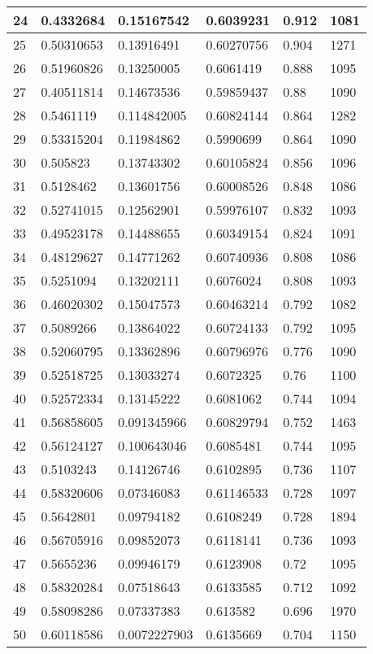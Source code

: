 \begin{longtable}{|l|l|l|l|l|l|}
24 & 0.4332684 & 0.15167542 & 0.6039231 & 0.912 & 1081 \\ \hline 
25 & 0.50310653 & 0.13916491 & 0.60270756 & 0.904 & 1271 \\ \hline 
26 & 0.51960826 & 0.13250005 & 0.6061419 & 0.888 & 1095 \\ \hline 
27 & 0.40511814 & 0.14673536 & 0.59859437 & 0.88 & 1090 \\ \hline 
28 & 0.5461119 & 0.114842005 & 0.60824144 & 0.864 & 1282 \\ \hline 
29 & 0.53315204 & 0.11984862 & 0.5990699 & 0.864 & 1090 \\ \hline 
30 & 0.505823 & 0.13743302 & 0.60105824 & 0.856 & 1096 \\ \hline 
31 & 0.5128462 & 0.13601756 & 0.60008526 & 0.848 & 1086 \\ \hline 
32 & 0.52741015 & 0.12562901 & 0.59976107 & 0.832 & 1093 \\ \hline 
33 & 0.49523178 & 0.14488655 & 0.60349154 & 0.824 & 1091 \\ \hline 
34 & 0.48129627 & 0.14771262 & 0.60740936 & 0.808 & 1086 \\ \hline 
35 & 0.5251094 & 0.13202111 & 0.6076024 & 0.808 & 1093 \\ \hline 
36 & 0.46020302 & 0.15047573 & 0.60463214 & 0.792 & 1082 \\ \hline 
37 & 0.5089266 & 0.13864022 & 0.60724133 & 0.792 & 1095 \\ \hline 
38 & 0.52060795 & 0.13362896 & 0.60796976 & 0.776 & 1090 \\ \hline 
39 & 0.52518725 & 0.13033274 & 0.6072325 & 0.76 & 1100 \\ \hline 
40 & 0.52572334 & 0.13145222 & 0.6081062 & 0.744 & 1094 \\ \hline 
41 & 0.56858605 & 0.091345966 & 0.60829794 & 0.752 & 1463 \\ \hline 
42 & 0.56124127 & 0.100643046 & 0.6085481 & 0.744 & 1095 \\ \hline 
43 & 0.5103243 & 0.14126746 & 0.6102895 & 0.736 & 1107 \\ \hline 
44 & 0.58320606 & 0.07346083 & 0.61146533 & 0.728 & 1097 \\ \hline 
45 & 0.5642801 & 0.09794182 & 0.6108249 & 0.728 & 1894 \\ \hline 
46 & 0.56705916 & 0.09852073 & 0.6118141 & 0.736 & 1093 \\ \hline 
47 & 0.5655236 & 0.09946179 & 0.6123908 & 0.72 & 1095 \\ \hline 
48 & 0.58320284 & 0.07518643 & 0.6133585 & 0.712 & 1092 \\ \hline 
49 & 0.58098286 & 0.07337383 & 0.613582 & 0.696 & 1970 \\ \hline 
50 & 0.60118586 & 0.0072227903 & 0.6135669 & 0.704 & 1150 \\ \hline 
\end{longtable}